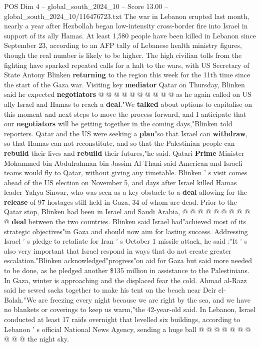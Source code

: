 \begin{textsample}{POS Dim 4 – global\_south\_2024\_10 – Score 13.00 – global\_south\_2024\_10/116476723.txt}
The war in Lebanon erupted last month, nearly a year after Hezbollah began low-intensity cross-border fire into Israel in support of its ally Hamas.
At least 1,580 people have been killed in Lebanon since September 23, according to an AFP tally of Lebanese health ministry figures, though the real number is likely to be higher.
The high civilian tolls from the fighting have sparked repeated calls for a halt to the wars, with US Secretary of State Antony Blinken \textbf{returning} to the region this week for the 11th time since the start of the Gaza war.
Visiting key \textbf{mediator} Qatar on Thursday, Blinken said he expected \textbf{negotiators} @ @ @ @ @ @ @ @ @ @ as he again called on US ally Israel and Hamas to reach a \textbf{deal}."We \textbf{talked} about options to capitalise on this moment and next steps to move the process forward, and I anticipate that our \textbf{negotiators} will be getting together in the coming days,"Blinken told reporters.
Qatar and the US were seeking a \textbf{plan}"so that Israel can \textbf{withdraw}, so that Hamas can not reconstitute, and so that the Palestinian people can \textbf{rebuild} their lives and \textbf{rebuild} their futures,"he said.
Qatari \textbf{Prime} Minister Mohammed bin Abdulrahman bin Jassim Al-Thani said American and Israeli teams would fly to Qatar, without giving any timetable.
Blinken ' s visit comes ahead of the US election on November 5, and days after Israel killed Hamas leader Yahya Sinwar, who was seen as a key obstacle to a \textbf{deal} allowing for the \textbf{release} of 97 hostages still held in Gaza, 34 of whom are dead.
Prior to the Qatar stop, Blinken had been in Israel and Saudi Arabia, @ @ @ @ @ @ @ @ @ @ \textbf{deal} between the two countries.
Blinken said Israel had"achieved most of its strategic objectives"in Gaza and should now aim for lasting success.
Addressing Israel ' s pledge to retaliate for Iran ' s October 1 missile attack, he said :"It ' s also very important that Israel respond in ways that do not create greater escalation."Blinken acknowledged"progress"on aid for Gaza but said more needed to be done, as he pledged another \$135 million in assistance to the Palestinians.
In Gaza, winter is approaching and the displaced fear the cold.
Ahmad al-Razz said he sewed sacks together to make his tent on the beach near Deir el-Balah."We are freezing every night because we are right by the sea, and we have no blankets or coverings to keep us warm,"the 42-year-old said.
In Lebanon, Israel conducted at least 17 raids overnight that levelled six buildings, according to Lebanon ' s official National News Agency, sending a huge ball @ @ @ @ @ @ @ @ @ @ the night sky.

\end{textsample}

